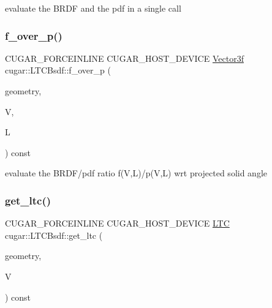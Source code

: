 evaluate the B\+R\+DF and the pdf in a single call \mbox{\label{structcugar_1_1_l_t_c_bsdf_a42c9dcd589647a78da3a1fedfc188907}} 
\subsubsection{\texorpdfstring{f\+\_\+over\+\_\+p()}{f\_over\_p()}}
{\footnotesize\ttfamily C\+U\+G\+A\+R\+\_\+\+F\+O\+R\+C\+E\+I\+N\+L\+I\+NE C\+U\+G\+A\+R\+\_\+\+H\+O\+S\+T\+\_\+\+D\+E\+V\+I\+CE \hyperlink{structcugar_1_1_vector}{Vector3f} cugar\+::\+L\+T\+C\+Bsdf\+::f\+\_\+over\+\_\+p (\begin{DoxyParamCaption}\item[{const \hyperlink{structcugar_1_1_differential_geometry}{Differential\+Geometry} \&}]{geometry,  }\item[{const \hyperlink{structcugar_1_1_vector}{Vector3f}}]{V,  }\item[{const \hyperlink{structcugar_1_1_vector}{Vector3f}}]{L }\end{DoxyParamCaption}) const\hspace{0.3cm}{\ttfamily [inline]}}

evaluate the B\+R\+D\+F/pdf ratio f(\+V,\+L)/p(V,L) wrt projected solid angle \mbox{\label{structcugar_1_1_l_t_c_bsdf_ad00d69ec594ae3b9fdd0d58822cc35da}} 
\subsubsection{\texorpdfstring{get\+\_\+ltc()}{get\_ltc()}}
{\footnotesize\ttfamily C\+U\+G\+A\+R\+\_\+\+F\+O\+R\+C\+E\+I\+N\+L\+I\+NE C\+U\+G\+A\+R\+\_\+\+H\+O\+S\+T\+\_\+\+D\+E\+V\+I\+CE \hyperlink{structcugar_1_1_l_t_c_bsdf_1_1_l_t_c}{L\+TC} cugar\+::\+L\+T\+C\+Bsdf\+::get\+\_\+ltc (\begin{DoxyParamCaption}\item[{const \hyperlink{structcugar_1_1_differential_geometry}{Differential\+Geometry} \&}]{geometry,  }\item[{const \hyperlink{structcugar_1_1_vector}{Vector3f}}]{V }\end{DoxyParamCaption}) const\hspace{0.3cm}{\ttfamily [inline]}}

